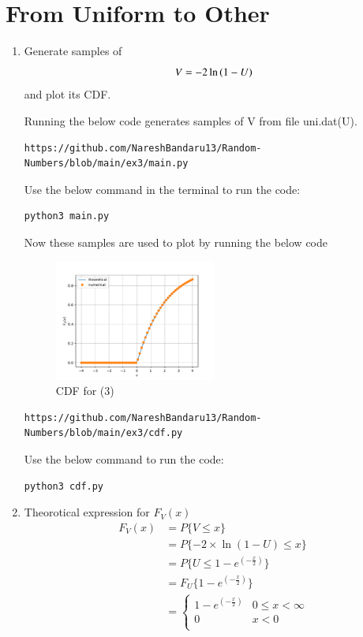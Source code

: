 \documentclass[journal,12pt,twocolumn]{IEEEtran}
\renewcommand\thesection{\arabic{section}}
\begin{document}
\section{From Uniform to Other}
\begin{enumerate}[label=\thesection.\arabic*,ref=\thesection.\theenumi]
\item
Generate samples of 
%
\begin{equation}
V = -2\ln\left(1-U\right)
\end{equation}
%
and plot its CDF.\\ 
\solution

Running the below code generates samples of V from file uni.dat(U).
\begin{lstlisting}
https://github.com/NareshBandaru13/Random-Numbers/blob/main/ex3/main.py
\end{lstlisting}
Use the below command in the terminal to run the code:
\begin{lstlisting}
python3 main.py
\end{lstlisting}
Now these samples are used to plot  by running the below code
 \begin{figure}[H]
\includegraphics[width=0.5\textwidth]{V_cdf.pdf}
\caption{CDF for (3)}
\label{fig:V}
\end{figure}
\begin{lstlisting}
https://github.com/NareshBandaru13/Random-Numbers/blob/main/ex3/cdf.py
\end{lstlisting}
Use the below command to run the code:
\begin{lstlisting}
python3 cdf.py
\end{lstlisting}

\item
Theorotical expression for $F_V (x)$
\begin{align*}
    F_V (x) &= P\{V \le x\} \\
            &= P\{-2\times \ln{(1-U)} \le x\} \\
            &= P\{U \le 1 - e^{(-\frac{x}{2})}\} \\ 
            &= F_U\{1- e^{(-\frac{x}{2})} \}\\
            &=
\begin{cases}
 1 - e^{(-\frac{x}{2})} & 0 \le x < \infty \\
 0  & x<0 \\
 \end{cases}
\end{align*} 
\end{enumerate}
\end{document}
